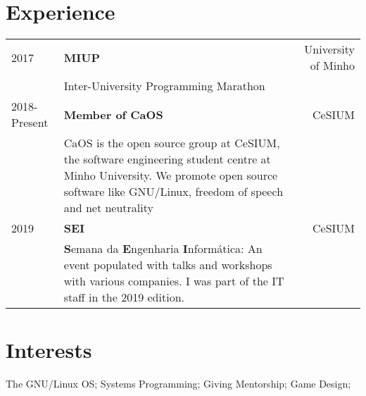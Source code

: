 \documentclass{article}
\begin{document}
\begin{textblock}{7.3}
    \section{Experience}
    \begin{tabular}{lp{8.4cm}r}
        2017 & \textbf{MIUP} & University of Minho\\
        & Inter-University Programming Marathon &\\
        2018-Present & \textbf{Member of CaOS} & CeSIUM\\
        & CaOS is the open source group at CeSIUM, the software engineering
        student centre at Minho University. We promote open source software
        like GNU/Linux, freedom of speech and net neutrality &\\
        2019 & \textbf{SEI} & CeSIUM \\
        & \textbf{S}emana da \textbf{E}ngenharia \textbf{I}nformática: An event
        populated with talks and workshops with various companies. I was part of
        the IT staff in the 2019 edition. &\\
    \end{tabular}

    \section{Interests}
    The GNU/Linux OS; Systems Programming; Giving Mentorship; Game Design;

\end{textblock}
\end{document}
